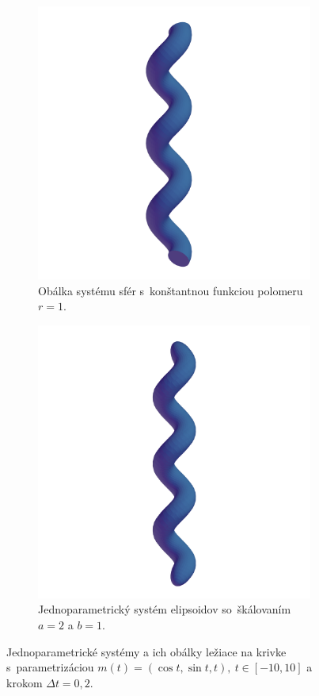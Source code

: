 \documentclass[12pt, twoside]{book}
\begin{document}
\begin{figure}[h]
\begin{subfigure}[t]{0.32\textwidth}
        \includegraphics[width=\textwidth]{images/helix_envelope2.png}
        	\caption{Obálka systému sfér s~konštantnou funkciou polomeru $r=1$.}
        \label{fig:plocha8}
    \end{subfigure}
    \hfill
    \begin{subfigure}[t]{0.32\textwidth}
        \centering
        \includegraphics[width=\textwidth]{images/helix_ellipsoids2.png}
        	\caption{Jednoparametrický systém elipsoidov so~škálovaním $a=2$ a $b=1$.}
        \label{fig:plocha9}
    \end{subfigure}
    	\caption[Katalóg vytlačených plôch II.]{Jednoparametrické systémy a ich obálky ležiace na krivke s~parametrizáciou  $m(t)=(\cos t, \sin t, t), \  t \in [-10, 10]$ a krokom $\Delta t = 0,2$.}
    \label{fig:katalogII}
\end{figure} 
 
\end{document}
